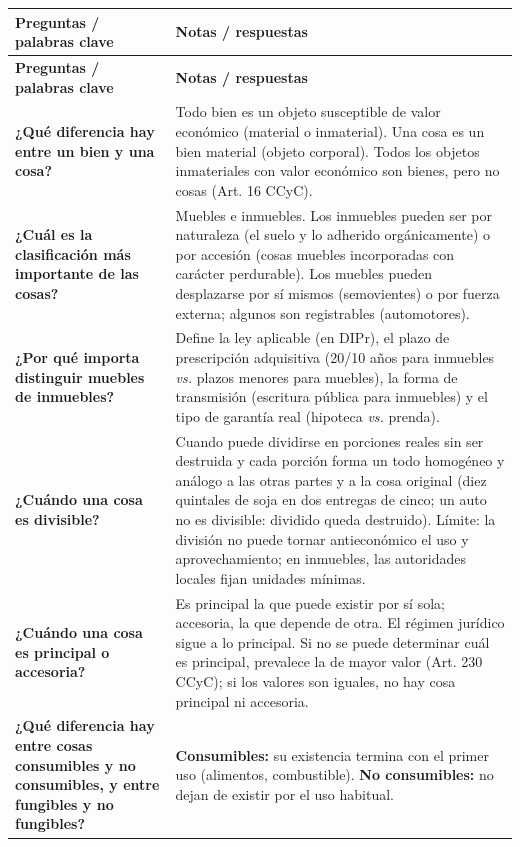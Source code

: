 \documentclass[12pt,oneside]{book}
\newcommand{\cornellinicio}{\begingroup\small\renewcommand{\arraystretch}{1.4}}
\newcommand{\cornellpregunta}[2]{\textbf{#1} & #2 \\ \hline}
\begin{document}
\cornellinicio
\begin{longtable}{|Q|Z|}
\hline
{}\textbf{Preguntas / palabras clave} & \textbf{Notas / respuestas} \\ \hline
\endfirsthead
\hline
{}\textbf{Preguntas / palabras clave} & \textbf{Notas / respuestas} \\ \hline
\endhead

\cornellpregunta{¿Qué diferencia hay entre un bien y una cosa?}{%
Todo bien es un objeto susceptible de valor económico (material o inmaterial). Una cosa es un bien material (objeto corporal). Todos los objetos inmateriales con valor económico son bienes, pero no cosas (Art. 16 CCyC).}

\cornellpregunta{¿Cuál es la clasificación más importante de las cosas?}{%
Muebles e inmuebles. Los inmuebles pueden ser por naturaleza (el suelo y lo adherido orgánicamente) o por accesión (cosas muebles incorporadas con carácter perdurable). Los muebles pueden desplazarse por sí mismos (semovientes) o por fuerza externa; algunos son registrables (automotores).}

\cornellpregunta{¿Por qué importa distinguir muebles de inmuebles?}{%
Define la ley aplicable (en DIPr), el plazo de prescripción adquisitiva (20/10 años para inmuebles \textit{vs.} plazos menores para muebles), la forma de transmisión (escritura pública para inmuebles) y el tipo de garantía real (hipoteca \textit{vs.} prenda).}

\cornellpregunta{¿Cuándo una cosa es divisible?}{%
Cuando puede dividirse en porciones reales sin ser destruida y cada porción forma un todo homogéneo y análogo a las otras partes y a la cosa original (diez quintales de soja en dos entregas de cinco; un auto no es divisible: dividido queda destruido). Límite: la división no puede tornar antieconómico el uso y aprovechamiento; en inmuebles, las autoridades locales fijan unidades mínimas.}

\cornellpregunta{¿Cuándo una cosa es principal o accesoria?}{%
Es principal la que puede existir por sí sola; accesoria, la que depende de otra. El régimen jurídico sigue a lo principal. Si no se puede determinar cuál es principal, prevalece la de mayor valor (Art. 230 CCyC); si los valores son iguales, no hay cosa principal ni accesoria.}

\cornellpregunta{¿Qué diferencia hay entre cosas consumibles y no consumibles, y entre fungibles y no fungibles?}{%
\textbf{Consumibles:} su existencia termina con el primer uso (alimentos, combustible). \textbf{No consumibles:} no dejan de existir por el uso habitual.

}
\end{longtable}
\end{document}
